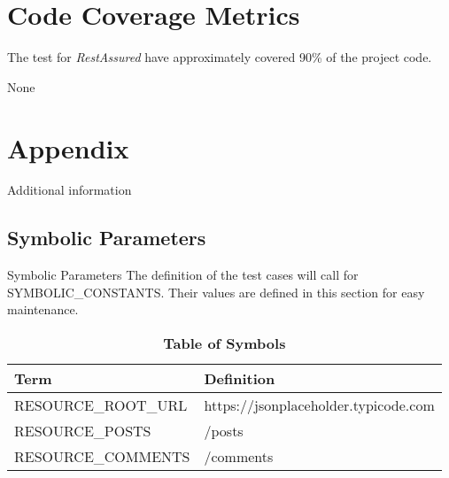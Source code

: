 \documentclass[12pt, titlepage]{article}
\begin{document}
		
\section{Code Coverage Metrics}
The test for \textit{RestAssured} have approximately covered 90\% of the project code.





None
\newpage

\section{Appendix}

Additional information

\subsection{Symbolic Parameters} \label{app:symb}{Symbolic Parameters}
The definition of the test cases will call for SYMBOLIC\_CONSTANTS.
Their values are defined in this section for easy maintenance.
\begin{table}[!htbp]
	\fontsize{9pt}{5pt}\selectfont
	\begin{tabularx}{\textwidth}{p{4cm}X}
		\toprule
		\textbf{Term} & \textbf{Definition}\\
		\midrule
		RESOURCE\_ROOT\_URL & https://jsonplaceholder.typicode.com\\
		RESOURCE\_POSTS & /posts \\
		RESOURCE\_COMMENTS & /comments \\
		\bottomrule
	\end{tabularx}
	\caption{\textbf{Table of Symbols}} \label{Table:symbols}
\end{table}	


\end{document}
